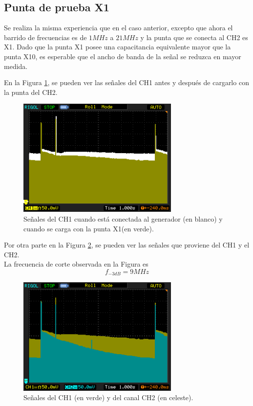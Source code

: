 \documentclass[a4paper,10pt]{article}
\begin{document}
		\subsection{Punta de prueba X1}
		Se realiza la misma experiencia que en el caso anterior, excepto que ahora el barrido de frecuencias es de $1MHz$ a $21MHz$ y la punta que se conecta al CH2 es X1. Dado que la punta X1 posee una capacitancia equivalente mayor que la punta X10, es esperable que el ancho de banda de la se\~nal se reduzca en mayor medida.

		En la Figura \ref{img003}, se pueden ver las se\~nales del CH1 antes y despu\'es de cargarlo con la punta del CH2. 
		\begin{figure}[!htb]
			\centering
			\includegraphics[width=8cm]{Imagenes/Mediciones instrumentos/NewFile4.png}
			\caption{Se\~nales del CH1 cuando est\'a conectada al generador (en blanco) y cuando se carga con la punta X1(en verde).} \label{img003}
		\end{figure}
		
		Por otra parte en la Figura \ref{img002}, se pueden ver las se\~nales que proviene del CH1 y el CH2. \\
		La frecuencia de corte observada en la Figura es $$f_{-3dB}=9MHz$$
		\begin{figure}[!htb]
			\centering
			\includegraphics[width=8cm]{Imagenes/Mediciones instrumentos/NewFile3.png}
			\caption{Se\~nales del CH1 (en verde) y del canal CH2 (en celeste).} \label{img002}
		\end{figure}						
		
\end{document}
